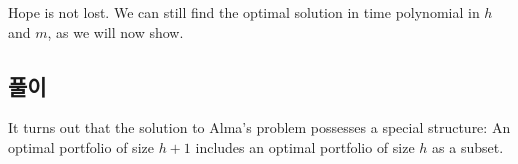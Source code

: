 \documentclass[12pt]{article} %
\newif\ifEN
\newtheorem{lemma}{Lemma}
\theoremstyle{definition}
\newtheorem{lemma}{기본정리}
\theoremstyle{definition}
\begin{document}
Hope is not lost. We can still find the optimal solution in time polynomial in $h$ and $m$, as we will now show.

\ifEN \subsection{Solution}  \else \subsection{풀이} \fi
It turns out that the solution to Alma's problem possesses a special structure: An optimal portfolio of size $h+1$ includes an optimal portfolio of size $h$ as a subset.
%
\end{document}
